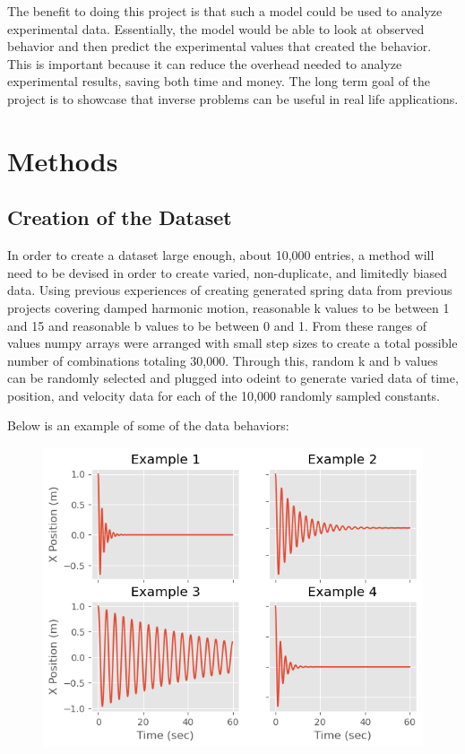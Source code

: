 \documentclass[12pt]{article}
\begin{document}
	The benefit to doing this project is that such a model could be used to analyze experimental data. Essentially, the model would be able to look at observed behavior and then predict the experimental values that created the behavior. This is important because it can reduce the overhead needed to analyze experimental results, saving both time and money. The long term goal of the project is to showcase that inverse problems can be useful in real life applications.

	\section*{ Methods}

	\subsection*{Creation of the Dataset}

	In order to create a dataset large enough, about 10,000 entries, a method will need to be devised in order to create varied, non-duplicate, and limitedly biased data. Using previous experiences of creating generated spring data from previous projects covering damped harmonic motion, reasonable k values to be between 1 and 15 and reasonable b values to be between 0 and 1. From these ranges of values numpy arrays were arranged with small step sizes to create a total possible number of combinations totaling 30,000. Through this, random k and b values can be randomly selected and plugged into odeint to generate varied data of time, position, and velocity data for each of the 10,000 randomly sampled constants.

	Below is an example of some of the data behaviors:

	\begin{figure}[H]
		\includegraphics[scale=0.400]{data_example.png}
		\centering
	\end{figure}
\end{document}
